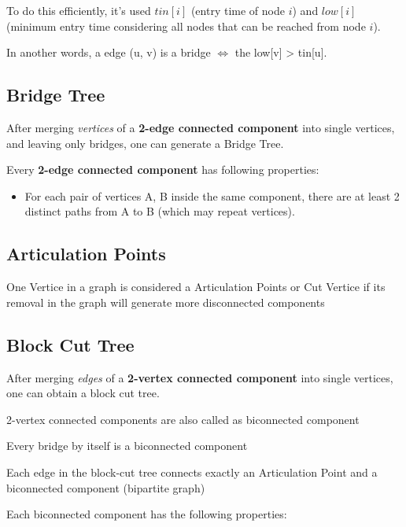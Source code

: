 		To do this efficiently, it's used $tin[i]$ (entry time of node $i$) and $low[i]$ (minimum entry time considering all nodes that can be reached from node $i$).
		
		In another words, a edge (u, v) is a bridge $\iff$ the low[v] > tin[u].


	\subsection{Bridge Tree}

	After merging \textit{vertices} of a \textbf{2-edge connected component} into single vertices, and leaving only bridges, one can generate a Bridge Tree.

	Every \textbf{2-edge connected component} has following properties:

    \begin{itemize}
		\item For each pair of vertices {A, B} inside the same component, there are at least 2 distinct paths from A to B (which may repeat vertices).
	\end{itemize}

	
	\subsection{Articulation Points} 

	One Vertice in a graph is considered a Articulation Points or Cut Vertice if its removal in the graph will generate more disconnected components


	\subsection{Block Cut Tree}

	After merging \textit{edges} of a \textbf{2-vertex connected component} into single vertices, one can obtain a block cut tree.

	2-vertex connected components are also called as biconnected component
	
	Every bridge by itself is a biconnected component

	Each edge in the block-cut tree connects exactly an Articulation Point and a biconnected component (bipartite graph)

	Each biconnected component has the following properties:

